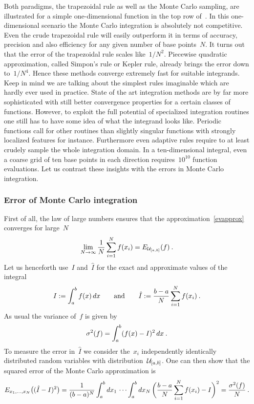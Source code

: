 Both paradigms, the trapezoidal rule as well as the Monte Carlo sampling, are
illustrated for a simple one-dimensional function in the top row
of~. In this one-dimensional scenario the Monte Carlo
integration is absolutely not competitive. Even the crude trapezoidal rule will
easily outperform it in terms of accuracy, precision and also efficiency for any
given number of base points~$N$. It turns out that the error of the trapezoidal
rule scales like~$1/N^2$. Piecewise quadratic approximation, called Simpon's
rule or Kepler rule, already brings the error down to~$1/N^4$. Hence these
methods converge extremely fast for suitable integrands. Keep in mind we are
talking about the simplest rules imaginable which are hardly ever used in
practice. State of the art integration methods are by far more sophisticated
with still better convergence properties for a certain classes of functions.
However, to exploit the full potential of specialized integration routines one
still has to have some idea of what the integrand looks like. Periodic functions
call for other routines than slightly singular functions with strongly localized
features for instance.  Furthermore even adaptive rules require to at least
crudely sample the whole integration domain. In a ten-dimensional integral, even
a coarse grid of ten base points in each direction requires~$10^{10}$ function
evaluations. Let us contrast these insights with the errors in Monte Carlo
integration.

\subsubsection{Error of Monte Carlo integration}

First of all, the law of large numbers ensures that the
approximation~\eqref{evapprox} converges for large~$N$
%
\begin{equation}
  \lim_{N \to \infty} \frac{1}{N} \sum_{i = 1}^N f(x_i) = E_{\mathcal{U}_{[a,b]}}(f)\:.
\end{equation}
%
Let us henceforth use~$I$ and~$\hat{I}$ for the exact and approximate values of
the integral
%
\begin{equation}
  I := \int_a^b f(x) \,dx \qquad\text{and}\qquad
  \hat{I} := \frac{b-a}{N} \sum_{i=1}^N f(x_i)\:.
\end{equation}
%
As usual the variance of~$f$ is given by
%
\begin{equation}
  \sigma^2(f) = \int_a^b (f(x) - I)^2 \,dx\:.
\end{equation}
%
To measure the error in~$\hat{I}$ we consider the~$x_i$ independently
identically distributed random variables with distribution~$\mathcal{U}_{[a,b]}$. One
can then show that the squared error of the Monte Carlo approximation is
%
\begin{equation}\label{mcerror}
  E_{x_1, \dots , x_N}\bigl((\hat{I} - I)^2\bigr) =
  \frac{1}{(b-a)^N}\int_a^b dx_1\, \cdots \int_a^b dx_N\,
  \biggl(\frac{b-a}{N} \sum_{i=1}^N f(x_i) - I\biggr)^2 =
  \frac{\sigma^2(f)}{N}\:.
\end{equation}


